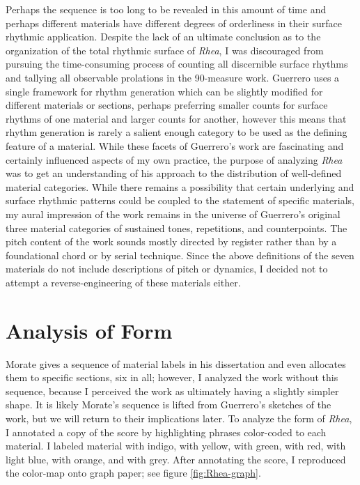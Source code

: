 Perhaps the sequence is too long to be revealed in this amount of time and perhaps different materials have different degrees of orderliness in their surface rhythmic application. Despite the lack of an ultimate conclusion as to the organization of the total rhythmic surface of \textit{Rhea}, I was discouraged from pursuing the time-consuming process of counting all discernible surface rhythms and tallying all observable prolations in the 90-measure work. Guerrero uses a single framework for rhythm generation which can be slightly modified for different materials or sections, perhaps preferring smaller counts for surface rhythms of one material and larger counts for another, however this means that rhythm generation is rarely a salient enough category to be used as the defining feature of a material. While these facets of Guerrero's work are fascinating and certainly influenced aspects of my own practice, the purpose of analyzing \textit{Rhea} was to get an understanding of his approach to the distribution of well-defined material categories. While there remains a possibility that certain underlying and surface rhythmic patterns could be coupled to the statement of specific materials, my aural impression of the work remains in the universe of Guerrero's original three material categories of sustained tones, repetitions, and counterpoints. The pitch content of the work sounds mostly directed by register rather than by a foundational chord or by serial technique. Since the above definitions of the seven materials do not include descriptions of pitch or dynamics, I decided not to attempt a reverse-engineering of these materials either.

\section{Analysis of Form}

Morate gives a sequence of material labels in his dissertation and even allocates them to specific sections, six in all; however, I analyzed the work without this sequence, because I perceived the work as ultimately having a slightly simpler shape. It is likely Morate's sequence is lifted from Guerrero's sketches of the work, but we will return to their implications later. To analyze the form of \textit{Rhea}, I annotated a copy of the score by highlighting phrases color-coded to each material. I labeled material  with indigo,  with yellow,  with green,  with red,  with light blue,  with orange, and  with grey. After annotating the score, I reproduced the color-map onto graph paper; see figure \ref{fig:Rhea-graph}.

